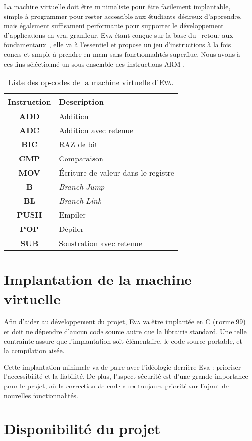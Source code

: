 \documentclass[11pt,twoside,french]{article}
\makeatletter
\providecommand{\og}{\leavevmode\flqq~}%
\providecommand{\fg}{\ifdim\lastskip>\z@\unskip\fi~\frqq}%
\newcommand{\noun}[1]{\textsc{#1}}
\makeatother
\begin{document}
La machine virtuelle doit être minimaliste pour être facilement implantable,
simple à programmer pour rester accessible aux étudiants désireux
d'apprendre, mais également suffisament performante pour supporter
le développement d'applications en vrai grandeur. \noun{Eva} étant
conçue sur la base du \og retour aux fondamentaux\fg , elle va à l'essentiel
et propose un jeu d'instructions à la fois concis et simple à prendre
en main sans fonctionnalités superflue. Nous avons à ces fins séléctionné
un sous-ensemble des instructions ARM .
\begin{table}[bp]
\begin{centering}
\begin{tabular}{|c|l|}
\hline
\textbf{Instruction} & \textbf{Description}\tabularnewline
\hline
\hline
\textbf{ADD} & Addition\tabularnewline
\hline
\textbf{ADC} & Addition avec retenue\tabularnewline
\hline
\textbf{BIC} & RAZ de bit\tabularnewline
\hline
\textbf{CMP} & Comparaison\tabularnewline
\hline
\textbf{MOV} & Écriture de valeur dans le registre\tabularnewline
\hline
\textbf{B} & \emph{Branch Jump}\tabularnewline
\hline
\textbf{BL} & \emph{Branch Link}\tabularnewline
\hline
\textbf{PUSH} & Empiler\tabularnewline
\hline
\textbf{POP} & Dépiler\tabularnewline
\hline
\textbf{SUB} & Soustration avec retenue\tabularnewline
\hline
\end{tabular}
\par\end{centering}
\caption{\label{tab:opcodes}Liste des op-codes de la machine virtuelle d'\noun{Eva}.}
\end{table}


\section{Implantation de la machine virtuelle}

Afin d'aider au développement du projet, \noun{Eva} va être implantée
en C (norme 99) et doit ne dépendre d'aucun code source autre que
la librairie standard. Une telle contrainte assure que l'implantation
soit élémentaire, le code source portable, et la compilation aisée.

Cette implantation minimale va de paire avec l'idéologie derrière
Eva : prioriser l'accessibilité et la fiabilité. De plus, l'aspect
sécurité est d'une grande importance pour le projet, où la correction
de code aura toujours priorité sur l'ajout de nouvelles fonctionnalités.

\section{Disponibilité du projet}
\end{document}
